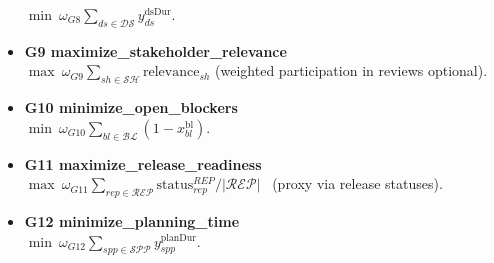 \documentclass[11pt,a4paper]{article}
\begin{document}
\begin{itemize}
  $\displaystyle \min \ \omega_{G8}\sum_{ds\in\mathcal{DS}} y^{\text{dsDur}}_{ds}$.
  \item \textbf{G9 maximize\_stakeholder\_relevance}\\
  $\displaystyle \max \ \omega_{G9}\sum_{sh\in\mathcal{SH}} \text{relevance}_{sh}$ (weighted participation in reviews optional).
  \item \textbf{G10 minimize\_open\_blockers}\\
  $\displaystyle \min \ \omega_{G10}\sum_{bl\in\mathcal{BL}} (1- x^{\text{bl}}_{bl})$.
  \item \textbf{G11 maximize\_release\_readiness}\\
  $\displaystyle \max \ \omega_{G11}\sum_{rep\in\mathcal{REP}} \text{status}^{REP}_{rep}\Big/\bigl|\mathcal{REP}\bigr|$  \ (proxy via release statuses).
  \item \textbf{G12 minimize\_planning\_time}\\
  $\displaystyle \min \ \omega_{G12}\sum_{spp\in\mathcal{SPP}} y^{\text{planDur}}_{spp}$.
\end{itemize}
\end{document}
